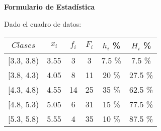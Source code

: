 \documentclass[11pt, a4paper]{article}
\newenvironment{tablaDeEjemplo}{}{}
\begin{document}

\textbf{\large{Formulario de Estadística}}
\begin{multicols}{2}
    \begin{tablaDeEjemplo}
        Dado el cuadro de datos:
        \begin{center}
            \begin{tabular}{|c|c|c|c|c|c|}
                \hline
                $Clases$ & $x_i$ & $f_i$ & $F_i$ & $h_i$ \% & $H_i$ \% \\
                \hline
                [3.3, 3.8) & 3.55 & 3  & 3  & 7.5 \%  & 7.5 \%  \\
    
                [3.8, 4.3) & 4.05 & 8  & 11 & 20 \%   & 27.5 \% \\
    
                [4.3, 4.8) & 4.55 & 14 & 25 & 35 \%   & 62.5 \% \\
    
                [4.8, 5.3) & 5.05 & 6  & 31 & 15 \%   & 77.5 \% \\
    
                [5.3, 5.8) & 5.55 & 4  & 35 & 10 \%   & 87.5 \% \\
    

\end{tabular}
\end{center}
\end{tablaDeEjemplo}
\end{multicols}
\end{document}
